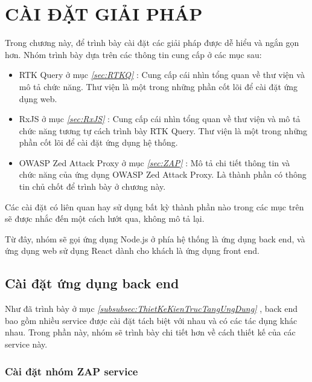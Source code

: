 \chapter{CÀI ĐẶT GIẢI PHÁP}

\tab Trong chương này, để trình bày cài đặt các giải pháp được dễ hiểu và ngắn gọn hơn.
Nhóm trình bày dựa trên các thông tin cung cấp ở các mục sau:

\begin{itemize}
  \item RTK Query ở mục \textit{\ref{sec:RTKQ} }: Cung cấp cái nhìn tổng quan về thư viện và mô tả chức năng.
        Thư viện là một trong những phần cốt lõi để cài đặt ứng dụng web.
  \item RxJS ở mục \textit{\ref{sec:RxJS} }: Cung cấp cái nhìn tổng quan về thư viện và mô tả chức năng tương tự cách trình bày RTK Query.
        Thư viện là một trong những phần cốt lõi để cài đặt ứng dụng hệ thống.
  \item OWASP Zed Attack Proxy ở mục \textit{\ref{sec:ZAP} }: Mô tả chi tiết thông tin và chức năng của ứng dụng OWASP Zed Attack Proxy.
        Là thành phần có thông tin chủ chốt để trình bày ở chương này.
\end{itemize}

Các cài đặt có liên quan hay sử dụng bất kỳ thành phần nào trong các mục trên sẽ được nhắc đến một cách lướt qua, không mô tả lại.

Từ đây, nhóm sẽ gọi ứng dụng Node.js ở phía hệ thống là ứng dụng back end, và ứng dụng web sử dụng React dành cho khách là ứng dụng front end.

\section{Cài đặt ứng dụng back end} \label{sec:CaiDatUngDungBackEnd}

\tab Như đã trình bày ở mục \textit{\ref{subsubsec:ThietKeKienTrucTangUngDung} }, back end bao gồm nhiều service được cài đặt tách biệt với nhau và có các tác dụng khác nhau.
Trong phần này, nhóm sẽ trình bày chi tiết hơn về cách thiết kế của các service này.

\subsection{Cài đặt nhóm ZAP service} \label{subsec:CaiDatNhomZapService}

